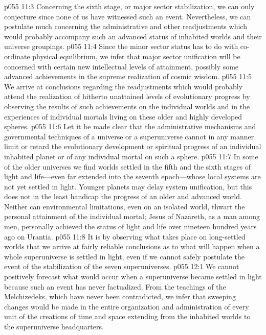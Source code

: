 \pc \vs p055 11:3  Concerning the sixth stage, or major sector stabilization, we can only conjecture since none of us have witnessed such an event. Nevertheless, we can postulate much concerning the administrative and other readjustments which would probably accompany such an advanced status of inhabited worlds and their universe groupings.
\vs p055 11:4 Since the minor sector status has to do with co\hyp{}ordinate physical equilibrium, we infer that major sector unification will be concerned with certain new intellectual levels of attainment, possibly some advanced achievements in the supreme realization of cosmic wisdom.
\pc \vs p055 11:5 We arrive at conclusions regarding the readjustments which would probably attend the realization of hitherto unattained levels of evolutionary progress by observing the results of such achievements on the individual worlds and in the experiences of individual mortals living on these older and highly developed spheres.
\vs p055 11:6 Let it be made clear that the administrative mechanisms and governmental techniques of a universe or a superuniverse cannot in any manner limit or retard the evolutionary development or spiritual progress of an individual inhabited planet or of any individual mortal on such a sphere.
\vs p055 11:7 In some of the older universes we find worlds settled in the fifth and the sixth stages of light and life---even far extended into the seventh epoch---whose local systems are not yet settled in light. Younger planets may delay system unification, but this does not in the least handicap the progress of an older and advanced world. Neither can environmental limitations, even on an isolated world, thwart the personal attainment of the individual mortal; Jesus of Nazareth, as a man among men, personally achieved the status of light and life over nineteen hundred years ago on Urantia.
\vs p055 11:8 It is by observing what takes place on long\hyp{}settled worlds that we arrive at fairly reliable conclusions as to what will happen when a whole superuniverse is settled in light, even if we cannot safely postulate the event of the stabilization of the seven superuniverses.
\vs p055 12:1 We cannot positively forecast what would occur when a superuniverse became settled in light because such an event has never factualized. From the teachings of the Melchizedeks, which have never been contradicted, we infer that sweeping changes would be made in the entire organization and administration of every unit of the creations of time and space extending from the inhabited worlds to the superuniverse headquarters.
